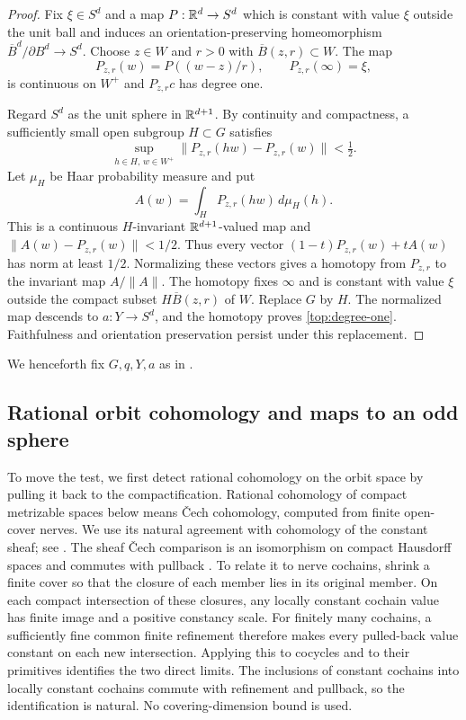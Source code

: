 \begin{proof}
Fix $\xi\in S^d$ and a map $P:\mathbb R^d\to S^d$ which is constant
with value $\xi$ outside the unit ball and induces an
orientation-preserving homeomorphism
$\overline B^d/\partial B^d\to S^d$.  Choose $z\in W$ and $r>0$
with $\overline B(z,r)\subset W$.  The map
\[
 P_{z,r}(w)=P((w-z)/r),\qquad P_{z,r}(\infty)=\xi,
\]
is continuous on $W^+$ and $P_{z,r}c$ has degree one.

Regard $S^d$ as the unit sphere in $\mathbb R^{d+1}$.  By continuity and
compactness, a sufficiently small open subgroup $H\subset G$
satisfies
\[
 \sup_{h\in H,\,w\in W^+}
 \|P_{z,r}(hw)-P_{z,r}(w)\|<\tfrac12.
\]
Let $\mu_H$ be Haar probability measure and put
\[
 A(w)=\int_H P_{z,r}(hw)\,d\mu_H(h).
\]
This is a continuous $H$-invariant $\mathbb R^{d+1}$-valued map and
$\|A(w)-P_{z,r}(w)\|<1/2$.  Thus every vector
$(1-t)P_{z,r}(w)+tA(w)$ has norm at least $1/2$.  Normalizing these
vectors gives a homotopy from $P_{z,r}$ to the invariant map
$A/\|A\|$.  The homotopy fixes $\infty$ and is constant with value
$\xi$ outside the compact subset $H\overline B(z,r)$ of $W$.
Replace $G$ by $H$.  The normalized map descends to $a:Y\to S^d$,
and the homotopy proves \eqref{top:degree-one}.  Faithfulness and
orientation preservation persist under this replacement.
\end{proof}

We henceforth fix $G,q,Y,a$ as in .

\subsection{Rational orbit cohomology and maps to an odd sphere}

To move the test, we first detect rational cohomology on the orbit
space by pulling it back to the compactification.  Rational
cohomology of compact metrizable spaces below means \v Cech
cohomology, computed from finite open-cover nerves. We use its natural
agreement with cohomology of the constant sheaf; see
\cite[\S1.6 and \S2]{BergfalkLupiniPanagiotopoulos2024}.
The sheaf \v Cech comparison is an isomorphism on compact Hausdorff
spaces and commutes with pullback
\cite[Lemmas~20.16.2 and~20.15.1]{StacksCechComparison}.
To relate it to nerve cochains, shrink a finite cover so that the
closure of each member lies in its original member. On each compact
intersection of these closures, any locally constant cochain value has
finite image and a positive constancy scale. For finitely many
cochains, a sufficiently fine common finite refinement therefore
makes every pulled-back value constant on each new intersection.
Applying this to cocycles and to their primitives identifies the two
direct limits. The inclusions of constant cochains into locally
constant cochains commute with refinement and pullback, so the
identification is natural. No covering-dimension bound is used.

